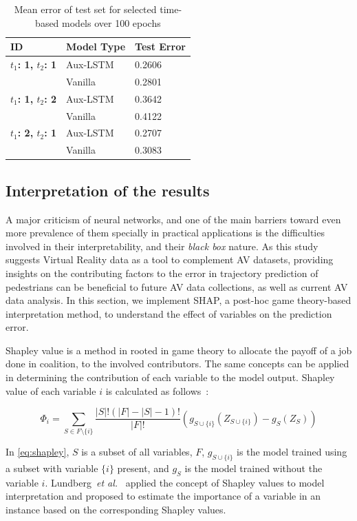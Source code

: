\begin{table}

    \caption{Mean error of test set for selected time-based models over 100 epochs}
    \centering
    \small\addtolength{\tabcolsep}{-3pt}
    \begin{tabular}{|l|l|l|}
    \hline
       \textbf{ID} & \textbf{Model Type}  & \textbf{Test Error } \\
       \hline
    
         \textbf{$t_1$: 1, $t_2$: 1}  & Aux-LSTM &  0.2606   \\
         \textbf{}  & Vanilla & 0.2801\\
         \hline
         \textbf{$t_1$: 1, $t_2$: 2} & Aux-LSTM & 0.3642     \\
          & Vanilla & 0.4122 \\
         \hline
         \textbf{$t_1$: 2, $t_2$: 1}  & Aux-LSTM & 0.2707\\
            & Vanilla &  0.3083 \\
    \hline
    \end{tabular}
    \label{tab:Ttest}
\end{table}

\subsection{Interpretation of the results}
A major criticism of neural networks, and one of the main barriers toward even more prevalence of them specially in practical applications is the difficulties involved in their interpretability, and their \textit{black box} nature. As this study suggests Virtual Reality data as a tool to complement AV datasets, providing insights on the contributing factors to the error in trajectory prediction of pedestrians can be beneficial to future AV data collections, as well as current AV data analysis. In this section, we implement SHAP, a post-hoc game theory-based interpretation method, to understand the effect of variables on the prediction error.

Shapley value is a method in rooted in game theory to allocate the payoff of a job done in coalition, to the involved contributors. The same concepts can be applied in determining the contribution of each variable to the model output. Shapley value of each variable $i$ is calculated as follows~\cite{lipovetsky2001analysis}:

\begin{linenomath}
\begin{equation}
\label{eq:shapley}
\Phi_i = \sum_{S \in F \setminus \{i\}} \frac{|S|! (|F| - |S| -1)!}{|F|!} \left(
g_{S\cup\{i\}}(Z_{S\cup\{i\}}) - g_S(Z_S) \right)
\end{equation}
\end{linenomath}
In \cref{eq:shapley}, $S$ is a subset of all variables, $F$, $g_{S\cup\{i\}}$ is the model trained using a subset with variable $\{i\}$ present, and $g_S$ is the model trained without the variable $i$. Lundberg~\textit{et al.}~\cite{lundberg2017unified} applied the concept of Shapley values to model interpretation and proposed to estimate the importance of a variable in an instance based on the corresponding Shapley values.


